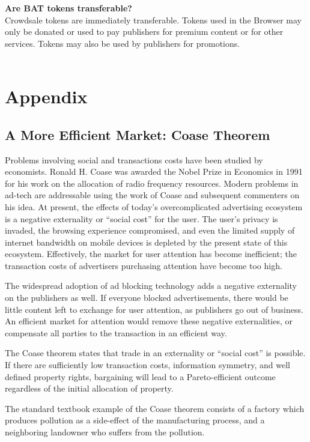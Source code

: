 \documentclass[11pt]{article}
\begin{document}
\vbox{\textbf{Are \textrm{BAT} tokens transferable? }\\
Crowdsale tokens are immediately transferable. Tokens used in the Browser may only be donated or used to pay publishers for premium content or for other services. Tokens may also be used by publishers for promotions.\\
\\
}

\pagebreak

\section{Appendix}
\label{sec-8}
\subsection{A More Efficient Market: Coase Theorem}
\label{sec-8-1}

Problems involving social and transactions costs have been studied by
economists. Ronald H. Coase was awarded the Nobel Prize in Economics
in 1991 for his work on the allocation of radio frequency resources.\cite{19}
Modern problems in ad-tech are addressable using the work of Coase and
subsequent commenters on his idea. At present, the effects of today's
overcomplicated advertising ecosystem is a negative externality or
``social cost'' for the user. The user's privacy is invaded, the
browsing experience compromised, and even the limited supply of
internet bandwidth on mobile devices is depleted by the present state
of this ecosystem. Effectively, the market for user attention has
become inefficient; the transaction costs of advertisers purchasing
attention have become too high. 

The widespread adoption of ad blocking technology adds a negative
externality on the publishers as well. If everyone blocked
advertisements, there would be little content left to exchange for
user attention, as publishers go out of business. An efficient market
for attention would remove these negative externalities, or compensate
all parties to the transaction in an efficient way. 

The Coase theorem states that trade in an externality or ``social cost''
is possible. If there are sufficiently low transaction costs,
information symmetry, and well defined property rights, bargaining
will lead to a Pareto-efficient outcome regardless of the initial
allocation of property. 

The standard textbook example of the Coase theorem consists of a
factory which produces pollution as a side-effect of the manufacturing
process, and a neighboring landowner who suffers from the pollution. 
\end{document}
